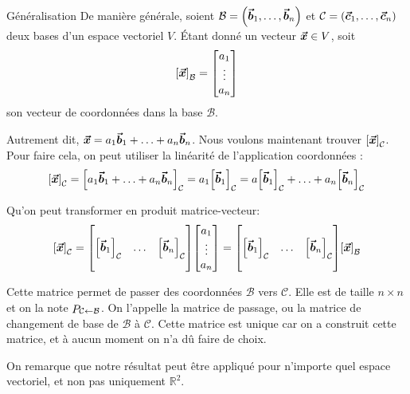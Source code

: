 \documentclass[a4paper]{article}
\begin{document}
\begin{parag}{Généralisation}
    De manière générale, soient $\mathcal{B} = \left(\bvec{b}_1, \ldots, \bvec{b}_n\right)$ et $\mathcal{C} = \left(\bvec{c}_1, \ldots, \bvec{c}_n\right)$ deux bases d'un espace vectoriel $V$. Étant donné un vecteur $\bm{\protect\vec{x}} \in V$, soit
    \[\left[\bvec{x}\right]_{\mathcal{B}} = \begin{bmatrix} a_1 \\ \vdots \\ a_n \end{bmatrix} \]
    son vecteur de coordonnées dans la base $\mathcal{B}$.

    Autrement dit, $\bm{\protect\vec{x}} = a_1 \bm{\protect\vec{b}}_1 + \ldots + a_n  \bm{\protect\vec{b}}_n$. Nous voulons maintenant trouver $\left[\bvec{x}\right]_{\mathcal{C}}$. Pour faire cela, on peut utiliser la linéarité de l'application coordonnées :
    \[\left[\bvec{x}\right]_{\mathcal{C}} = \left[a_1 \bvec{b}_1 + \ldots + a_n \bvec{b}_n\right]_{\mathcal{C}} = a_1 \left[\bvec{b}_1\right]_{\mathcal{C}} = a\left[\bvec{b}_1\right]_{\mathcal{C}} + \ldots + a_n\left[\bvec{b}_n\right]_{\mathcal{C}}\]

    Qu'on peut transformer en produit matrice-vecteur:
    \[\left[\bvec{x}\right]_{\mathcal{C}} = \begin{bmatrix}  &  &  \\ \left[\bvec{b}_1\right]_{\mathcal{C}} & \ldots & \left[\bvec{b}_n\right]_{\mathcal{C}} \\  &  &  \end{bmatrix} \begin{bmatrix} a_1 \\ \vdots \\ a_n \end{bmatrix} = \begin{bmatrix}  &  &  \\ \left[\bvec{b}_1\right]_{\mathcal{C}} & \ldots & \left[\bvec{b}_n\right]_{\mathcal{C}} \\  &  &  \end{bmatrix} \left[\bvec{x}\right]_{\mathcal{B}}\]


    Cette matrice permet de passer des coordonnées $\mathcal{B}$ vers $\mathcal{C}$. Elle est de taille $n \times n$ et on la note $\mathop{P}_{\mathcal{C} \leftarrow \mathcal{B}}$. On l'appelle la matrice de passage, ou la matrice de changement de base de $\mathcal{B}$ à $\mathcal{C}$. Cette matrice est unique car on a construit cette matrice, et à aucun moment on n'a dû faire de choix.

    On remarque que notre résultat peut être appliqué pour n'importe quel espace vectoriel, et non pas uniquement $\mathbb{R}^2$.
\end{parag}
\end{document}
